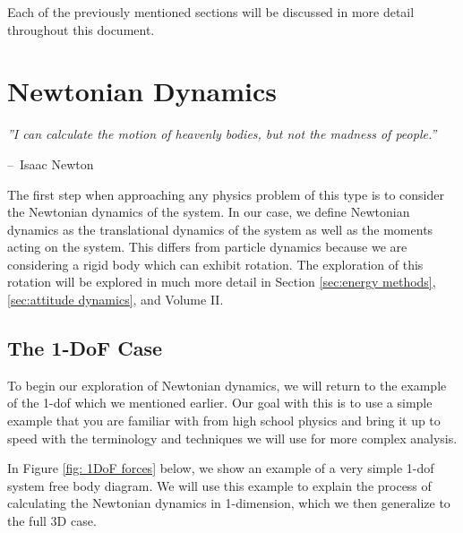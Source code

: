 \documentclass[12pt]{report}
\makeatletter
\newenvironment{chapquote}[2][2em]
  {\setlength{\@tempdima}{#1}%
   \def\chapquote@author{#2}%
   \parshape 1 \@tempdima \dimexpr\textwidth-2\@tempdima\relax%
   \itshape}
  {\par\normalfont\hfill--\ \chapquote@author\hspace*{\@tempdima}\par\bigskip}
\makeatother
\begin{document}
Each of the previously mentioned sections will be discussed in more detail throughout this document.

\chapter{Newtonian Dynamics}\label{sec: Newtonian Dynamics}
\begin{chapquote}{Isaac Newton}
''I can calculate the motion of heavenly bodies, but not the madness of people.''
\end{chapquote}
The first step when approaching any physics problem of this type is to consider the Newtonian dynamics of the system. In our case, we define Newtonian dynamics as the translational dynamics of the system as well as the moments acting on the system. This differs from particle dynamics because we are considering a rigid body which can exhibit rotation. The exploration of this rotation will be explored in much more detail in Section \ref{sec:energy methods},\ref{sec:attitude dynamics}, and Volume II. 
\section{The 1-DoF Case}\label{sec: The 1DoF Case}
To begin our exploration of Newtonian dynamics, we will return to the example of the 1-\gls{dof} which we mentioned earlier. Our goal with this is to use a simple example that you are familiar with from high school physics and bring it up to speed with the terminology and techniques we will use for more complex analysis.

In Figure \ref{fig: 1DoF forces} below, we show an example of a very simple 1-\gls{dof} system free body diagram. We will use this example to explain the process of calculating the Newtonian dynamics in 1-dimension, which we then generalize to the full 3D case. 

\end{document}
